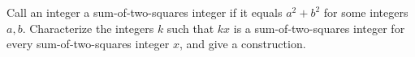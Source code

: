 Call an integer a sum-of-two-squares integer if it equals $a^2+b^2$ for some integers $a,b$. Characterize the integers $k$ such that $kx$ is a sum-of-two-squares integer for every sum-of-two-squares integer $x$, and give a construction.
